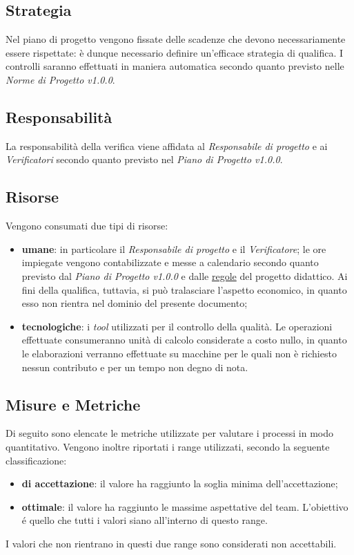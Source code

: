 \subsection{Strategia}
Nel piano di progetto vengono fissate delle scadenze che devono necessariamente essere rispettate: \`e dunque necessario definire un'efficace strategia di qualifica. I controlli saranno effettuati in maniera automatica secondo quanto previsto nelle \textit{Norme di Progetto v1.0.0}. 

\subsection{Responsabilit\`a}
La responsabilit\`a della verifica viene affidata al \textit{Responsabile di progetto} e ai \textit{Verificatori} secondo quanto previsto nel \textit{Piano di Progetto v1.0.0}.

\subsection{Risorse}
Vengono consumati due tipi di risorse:
\begin{itemize}
	\item \textbf{umane}: in particolare il \textit{Responsabile di progetto} e il \textit{Verificatore}; le ore impiegate vengono contabilizzate e messe a calendario secondo quanto previsto dal \textit{Piano di Progetto v1.0.0} e dalle \href{http://www.math.unipd.it/~tullio/IS-1/2015/Dispense/PD01.pdf}{regole} del progetto didattico. Ai fini della qualifica, tuttavia, si pu\`o tralasciare l'aspetto economico, in quanto esso non rientra nel dominio del presente documento;
		\item \textbf{tecnologiche}: i \textit{tool} utilizzati per il controllo della qualit\`a. Le operazioni effettuate  consumeranno unit\`a di calcolo considerate a costo nullo, in quanto le elaborazioni verranno effettuate su macchine per le quali non \`e richiesto nessun contributo e per un tempo non degno di nota.
\end{itemize}

\subsection{Misure e Metriche}
Di seguito sono elencate le metriche utilizzate per valutare i processi in modo quantitativo. Vengono inoltre riportati i range utilizzati, secondo la seguente classificazione:
\begin{itemize}
	\item \textbf{di accettazione}: il valore ha raggiunto la soglia minima dell'accettazione;
	\item \textbf{ottimale}: il valore ha raggiunto le massime aspettative del team. L'obiettivo \'e quello che tutti i valori siano all'interno di questo range.
\end{itemize}
I valori che non rientrano in questi due range sono considerati non accettabili.

